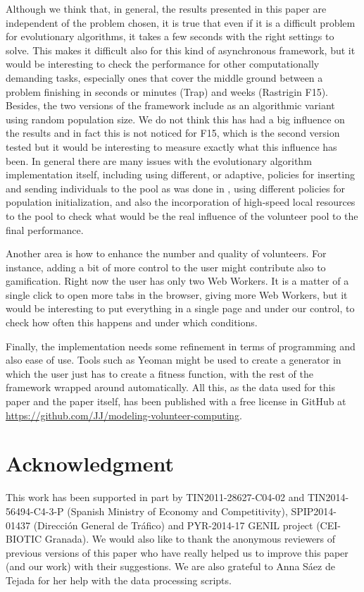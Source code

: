 \documentclass[journal,onecolumn]{IEEEtran}
\begin{document}
Although we think that, in general, the results presented in this
paper are independent of the problem chosen, it is true that even if
it is a difficult problem for evolutionary algorithms, it takes a few
seconds with the right settings to solve. This makes it difficult also
for this kind of asynchronous framework, but it would be interesting
to check the performance for other computationally demanding
tasks, especially ones that cover the middle ground between a problem
finishing in seconds or minutes (Trap) and weeks (Rastrigin F15). 
Besides, the two versions of the framework include as an
algorithmic variant using random population size. We do not think this
has had a big influence on the results and in fact this is not noticed
for F15, which is the second version tested but it would be interesting to
measure exactly what this influence has been. In general there are
many issues with the evolutionary algorithm implementation itself,
including using different, or adaptive, policies for inserting and
sending individuals to the pool as was done in \cite{araujo2008mam},
using different policies for population initialization, and also the
incorporation of high-speed local resources to the pool to check what
would be the real influence of the volunteer pool to the final
performance. 

Another area is how to enhance the number and quality of
volunteers. For instance, adding a bit of more
control to the user might contribute also to gamification. Right now
the user has only two Web Workers. It is a matter of a single click to
open more tabs in the browser, giving more Web Workers, but it would be
interesting to put everything in a single page and under our control,
to check how often this happens and under which conditions. 

Finally, the implementation needs some refinement in terms of
programming and also ease of use. Tools such as Yeoman might be used %
to create a generator in which the user just has to create a fitness
function, with the rest of the framework wrapped around
automatically. All this, as the data used for this paper and the paper
itself, has been published with a free license in GitHub at
\url{https://github.com/JJ/modeling-volunteer-computing}.  

\section*{Acknowledgment}

This work has been supported in part by TIN2011-28627-C04-02 and
TIN2014-56494-C4-3-P (Spanish Ministry of Economy and Competitivity),
SPIP2014-01437 (Direcci{\'o}n General de Tr{\'a}fico) and PYR-2014-17
GENIL project (CEI-BIOTIC Granada). We would also like to thank the
anonymous reviewers of previous versions of this paper who have really
helped us to improve 
this paper (and our work) with their suggestions. We are also grateful
to Anna S\'aez de Tejada for her help with the data processing scripts.



\end{document}

